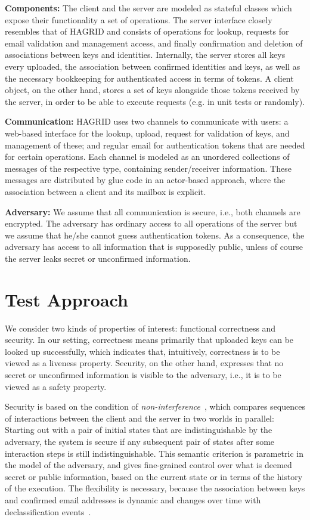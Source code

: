 \documentclass{llncs}
\begin{document}
\textbf{Components:} The client and the server are modeled as stateful classes which expose their functionality a set of operations.
The server interface closely resembles that of HAGRID and consists of operations for lookup, requests for email validation and management access,
and finally confirmation and deletion of associations between keys and identities.
Internally, the server stores all keys every uploaded, the association between confirmed identities and keys,
as well as the necessary bookkeeping for authenticated access in terms of tokens.
A client object, on the other hand, stores a set of keys alongside those tokens received by the server, in order to be able to execute requests (e.g. in unit tests or randomly).

\textbf{Communication:} HAGRID uses two channels to communicate with users:
a web-based interface for the lookup, upload, request for validation of keys, and management of these;
and regular email for authentication tokens that are needed for certain operations.
Each channel is modeled as an unordered collections of messages of the respective type, containing sender/receiver information.
These messages are distributed by glue code in an actor-based approach,
where the association between a client and its mailbox is explicit.

\textbf{Adversary:} We assume that all communication is secure, i.e., both channels are encrypted.
The adversary has ordinary access to all operations of the server but we assume that he/she cannot guess authentication tokens.
As a consequence, the adversary has access to all information that is supposedly public,
unless of course the server leaks secret or unconfirmed information.

\section{Test Approach}


We consider two kinds of properties of interest: functional correctness and security.
In our setting, correctness means primarily that uploaded keys can be looked up successfully,
which indicates that, intuitively, correctness is to be viewed as a liveness property.
Security, on the other hand, expresses that no secret or unconfirmed information is visible to the adversary,
i.e., it is to be viewed as a safety property.

Security is based on the condition of \emph{non-interference}~\cite{},
which compares sequences of interactions between the client and the server in two worlds in parallel:
Starting out with a pair of initial states that are indistinguishable by the adversary,
the system is secure if any subsequent pair of states after some interaction steps is still indistinguishable.
This semantic criterion is parametric in the model of the adversary, and gives fine-grained control over what is deemed secret or public information, based on the current state or in terms of the history of the execution.
The flexibility is necessary, because the association between keys and confirmed email addresses is dynamic and changes over time with declassification events~\cite{}.
\end{document}
